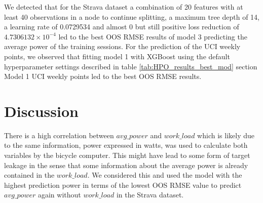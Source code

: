 \documentclass[12pt,a4paper]{article}
\begin{document}
We detected that for the Strava dataset a combination of 20 features with at least 40 observations in a node to continue splitting, a maximum tree depth of 14, a learning rate of 0.0729534 and almost 0 but still positive loss reduction of \ensuremath{4.7306132\times 10^{-4}} led to the best OOS RMSE results of model 3 predicting the average power of the training sessions. For the prediction of the UCI weekly points, we observed that fitting model 1 with XGBoost using the default hyperparameter settings described in table \ref{tab:HPO_results_best_mod} section Model 1 UCI weekly points led to the best OOS RMSE results.

\hypertarget{discussion}{%
\section{\texorpdfstring{Discussion \label{sec:discussion}}{Discussion }}\label{discussion}}

There is a high correlation between \(avg\_power\) and \(work\_load\) which is likely due to the same information, power expressed in watts, was used to calculate both variables by the bicycle computer. This might have lead to some form of target leakage in the sense that some information about the average power is already contained in the \(work\_load\). We considered this and used the model with the highest prediction power in terms of the lowest OOS RMSE value to predict \(avg\_power\) again without \(work\_load\) in the Strava dataset.
\end{document}
